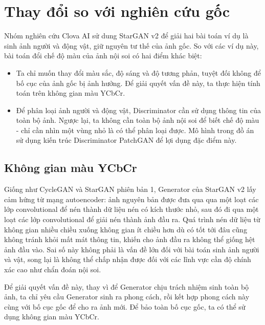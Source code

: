 \documentclass[12pt]{extreport}
\begin{document}
\section{Thay đổi so với nghiên cứu gốc}

Nhóm nghiên cứu Clova AI sử dung StarGAN v2 để giải hai bài toán ví dụ là sinh ảnh người và động vật, giữ nguyên tư thế của ảnh gốc. So với các ví dụ này, bài toán đổi chế độ màu của ảnh nội soi có hai điểm khác biệt:
\begin{itemize}
    \item Ta chỉ muốn thay đổi màu sắc, độ sáng và độ tương phản, tuyệt đối không để bố cục của ảnh gốc bị ảnh hưởng. Để giải quyết vấn đề này, ta thực hiện tính toán trên không gian màu YCbCr.
    \item Để phân loại ảnh người và động vật, Discriminator cần sử dụng thông tin của toàn bộ ảnh. Ngược lại, ta không cần toàn bộ ảnh nội soi để biết chế độ màu - chỉ cần nhìn một vùng nhỏ là có thể phân loại được. Mô hình trong đồ án sử dụng kiến trúc Discriminator PatchGAN để lợi dụng đặc điểm này.
\end{itemize}

\subsection{Không gian màu YCbCr}
\label{ycbcr-colorspace}

Giống như CycleGAN và StarGAN phiên bản 1, Generator của StarGAN v2 lấy cảm hứng từ mạng autoencoder: ảnh nguyên bản được đưa qua qua một loạt các lớp convolutional để nén thành dữ liệu nén có kích thước nhỏ, sau đó đi qua một loạt các lớp convolutional để giải nén thành ảnh đầu ra. Quá trình nén dữ liệu từ không gian nhiều chiều xuống không gian ít chiều hơn dù có tốt tới đâu cũng không tránh khỏi mất mát thông tin, khiến cho ảnh đầu ra không thể giống hệt ảnh đầu vào. Sai số này không phải là vấn đề lớn đối với bài toán sinh ảnh người và vật, song lại là không thể chấp nhận được đối với các lĩnh vực cần độ chính xác cao như chẩn đoán nội soi.

Để giải quyết vấn đề này, thay vì để Generator chịu trách nhiệm sinh toàn bộ ảnh, ta chỉ yêu cầu Generator sinh ra phong cách, rồi kết hợp phong cách này cùng với bố cục gốc để cho ra ảnh mới. Để bảo toàn bố cục gốc, ta có thể sử dụng không gian màu YCbCr.
\end{document}
